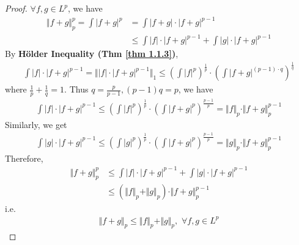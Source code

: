 \begin{thm}
 		\vspace{4em}
 		\begin{proof}
 			$\forall f , g \in L^p$, we have
 			\begin{align}
 				\Vert f + g \Vert_{p}^p 
 				= \int{\left| f + g \right|^p} 
 				&= \int{\left| f + g \right| \cdot \left| f + g \right|^{p - 1}} \\
 				&\leq \int{\left| f \right| \cdot \left| f + g \right|^{p - 1}} + \int{\left| g \right| \cdot \left| f + g \right|^{p - 1}}
 			\end{align}
 			By \textbf{H\"{o}lder Inequality (Thm \ref{thm 1.1.3})},
 			\begin{align}
 				\int{\left| f \right| \cdot \left| f + g \right|^{p - 1}}
 				= \Vert \left| f \right| \cdot \left| f + g \right|^{p - 1} \Vert_{1} 
 				\leq \left( \int{\left| f \right|^p} \right)^{\frac{1}{p}} \cdot \left( \int{\left| f + g \right|^{(p - 1) \cdot q}} \right)^{\frac{1}{q}}
 			\end{align}
 			where $\frac{1}{p} + \frac{1}{q} = 1$. Thus $q = \frac{p}{p - 1}, (p - 1) q = p$, we have
 			\begin{align}
 				\int{\left| f \right| \cdot \left| f + g \right|^{p - 1}}
 				\leq \left( \int{\left| f \right|^p} \right)^{\frac{1}{p}} \cdot \left( \int{\left| f + g \right|^{p}} \right)^{\frac{p - 1}{p}}
 				= \Vert f \Vert_{p} \cdot \Vert f + g \Vert_{p}^{p - 1}
 			\end{align}
 			Similarly, we get
 			\begin{align}
 				\int{\left| g \right| \cdot \left| f + g \right|^{p - 1}}
 				\leq \left( \int{\left| g \right|^p} \right)^{\frac{1}{p}} \cdot \left( \int{\left| f + g \right|^{p}} \right)^{\frac{p - 1}{p}}
 				= \Vert g \Vert_{p} \cdot \Vert f + g \Vert_{p}^{p - 1}
 			\end{align}	
 			Therefore,
 			\begin{align}
 				\Vert f + g \Vert_{p}^{p} 
 				&\leq \int{\left| f \right| \cdot \left| f + g \right|^{p - 1}} + \int{\left| g \right| \cdot \left| f + g \right|^{p - 1}} \\
 				&\leq \left( \Vert f \Vert_{p} + \Vert g \Vert_{p} \right) \cdot \Vert f + g \Vert_{p}^{p - 1}
 			\end{align}
 			i.e.
 			\begin{align}
 				\Vert f + g \Vert_{p} \leq \Vert f \Vert_{p} + \Vert g \Vert_{p} , \,\, \forall f , g \in L^p
 			\end{align}
 		\end{proof}
 	\end{thm}
 

